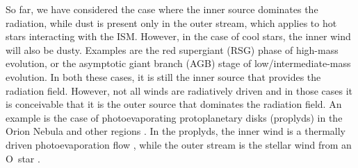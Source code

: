So far, we have considered the case where the inner source dominates
the radiation, while dust is present only in the outer stream, which
applies to hot stars interacting with the ISM.  However, in the case
of cool stars, the inner wind will also be dusty.  Examples are the
red supergiant (RSG) phase of high-mass evolution, or the asymptotic
giant branch (AGB) stage of low/intermediate-mass evolution.  In both
these cases, it is still the inner source that provides the radiation
field.  However, not all winds are radiatively driven and in those
cases it is conceivable that it is the outer source that dominates the
radiation field.  An example is the case of photoevaporating
protoplanetary disks (proplyds) in the Orion Nebula and other \hii{}
regions \citep{ODell:1994a}.  In the proplyds, the inner wind is a
thermally driven photoevaporation flow \citep{HA:1998, Henney:1999a},
while the outer stream is the stellar wind from an O~star
\citep{Garcia-Arredondo:2001a}.


